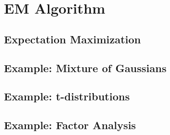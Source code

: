 
\chapter{EM Algorithm}
\label{chapter7}

\section{Expectation Maximization}

\section{Example: Mixture of Gaussians}

\section{Example: t-distributions}

\section{Example: Factor Analysis}